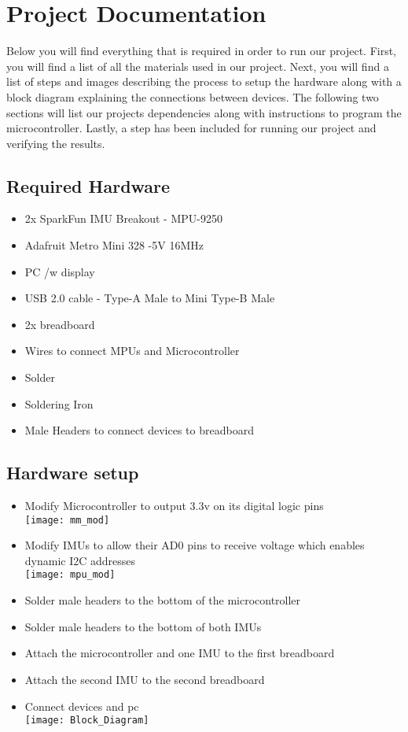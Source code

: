 \newpage
\section{Project Documentation}
Below you will find everything that is required in order to run our project.
First, you will find a list of all the materials used in our project.
Next, you will find a list of steps and images describing the process to setup the hardware along with a block diagram explaining the connections between devices.
The following two sections will list our projects dependencies along with instructions to program the microcontroller.
Lastly, a step has been included for running our project and verifying the results. \\

\subsection{Required Hardware}
\begin{itemize}
\item{2x SparkFun IMU Breakout - MPU-9250}
\item{Adafruit Metro Mini 328 -5V 16MHz}
\item{PC /w display}
\item{USB 2.0 cable - Type-A Male to Mini Type-B Male}
\item{2x breadboard}
\item{Wires to connect MPUs and Microcontroller}
\item{Solder}
\item{Soldering Iron}
\item{Male Headers to connect devices to breadboard}
\end{itemize}

\subsection{Hardware setup}
\begin{itemize}
\item{Modify Microcontroller to output 3.3v on its digital logic pins \\ \texttt{[image: mm\_mod]}}
\item{Modify IMUs to allow their AD0 pins to receive voltage which enables dynamic I2C addresses \\ \texttt{[image: mpu\_mod]}}
\item{Solder male headers to the bottom of the microcontroller}
\item{Solder male headers to the bottom of both IMUs}
\item{Attach the microcontroller and one IMU to the first breadboard}
\item{Attach the second IMU to the second breadboard}
\item{Connect devices and pc \\ \texttt{[image: Block\_Diagram]}}

\end{itemize}

